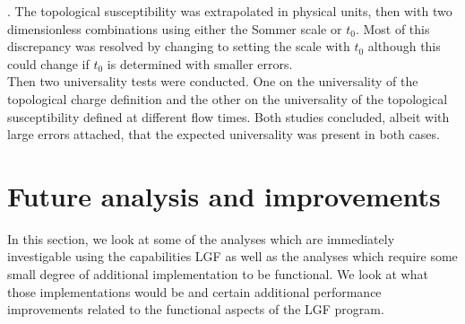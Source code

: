 \documentclass[a4paper,10pt]{book}
\begin{document}
\cite{non_gaussianities2015}. The topological susceptibility was extrapolated in physical units, then with two dimensionless combinations using either the Sommer scale or $t_0$. Most of this discrepancy was resolved by changing to setting the scale with $t_0$ although this could change if $t_0$ is determined with smaller errors.\\Then two universality tests were conducted. One on the universality of the topological charge definition and the other on the universality of the topological susceptibility defined at different flow times. Both studies concluded, albeit with large errors attached, that the expected universality was present in both cases.


\section{Future analysis and improvements}
In this section, we look at some of the analyses which are immediately investigable using the capabilities LGF as well as the analyses which require some small degree of additional implementation to be functional. We look at what those implementations would be and certain additional performance improvements related to the functional aspects of the LGF program.
\end{document}
